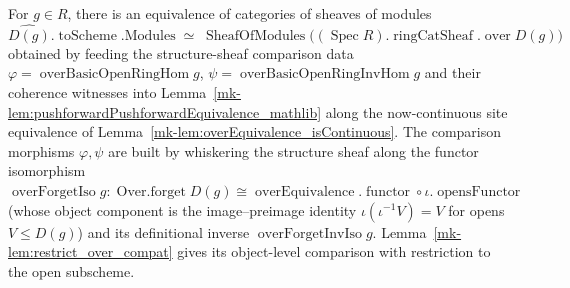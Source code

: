 \begin{definition}
  \label{mk-def:modules_over_basicOpen_equivalence}

  For \(g \in R\), there is an equivalence of categories of sheaves of
  modules
  \[
    \widehat{D(g)}.\operatorname{toScheme}.\mathrm{Modules} \;\simeq\;
    \operatorname{SheafOfModules}\bigl((\operatorname{Spec} R).\operatorname{ringCatSheaf}.\operatorname{over} D(g)\bigr)
  \]
  obtained by feeding the structure-sheaf comparison data
  \(\varphi = \operatorname{overBasicOpenRingHom} g\),
  \(\psi = \operatorname{overBasicOpenRingInvHom} g\) and their coherence witnesses into
  Lemma~\ref{mk-lem:pushforwardPushforwardEquivalence_mathlib} along the now-continuous site equivalence
  of Lemma~\ref{mk-lem:overEquivalence_isContinuous}. The comparison morphisms \(\varphi, \psi\) are built
  by whiskering the structure sheaf along the functor isomorphism
  \(\operatorname{overForgetIso} g : \operatorname{Over.forget} D(g) \cong
  \operatorname{overEquivalence}.\operatorname{functor} \circ \iota.\operatorname{opensFunctor}\)
  (whose object component is the image--preimage identity
  \(\iota(\iota^{-1} V) = V\) for opens \(V \le D(g)\)) and its definitional inverse
  \(\operatorname{overForgetInvIso} g\). Lemma~\ref{mk-lem:restrict_over_compat} gives its
  object-level comparison with restriction to the open subscheme.
\end{definition}

